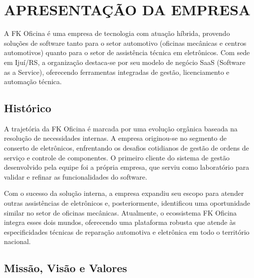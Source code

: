 
\chapter{APRESENTAÇÃO DA EMPRESA}
\label{ch:apresentacao-empresa}

A FK Oficina é uma empresa de tecnologia com atuação híbrida, provendo soluções de software tanto para o setor automotivo (oficinas mecânicas e centros automotivos) quanto para o setor de assistência técnica em eletrônicos. Com sede em Ijuí/RS, a organização destaca-se por seu modelo de negócio SaaS (Software as a Service), oferecendo ferramentas integradas de gestão, licenciamento e automação técnica.

\section{Histórico}
\label{sec:historico}

A trajetória da FK Oficina é marcada por uma evolução orgânica baseada na resolução de necessidades internas. A empresa originou-se no segmento de conserto de eletrônicos, enfrentando os desafios cotidianos de gestão de ordens de serviço e controle de componentes. O primeiro cliente do sistema de gestão desenvolvido pela equipe foi a própria empresa, que serviu como laboratório para validar e refinar as funcionalidades do software.

Com o sucesso da solução interna, a empresa expandiu seu escopo para atender outras assistências de eletrônicos e, posteriormente, identificou uma oportunidade similar no setor de oficinas mecânicas. Atualmente, o ecossistema FK Oficina integra esses dois mundos, oferecendo uma plataforma robusta que atende às especificidades técnicas de reparação automotiva e eletrônica em todo o território nacional.

\section{Missão, Visão e Valores}
\label{sec:missao-visao-valores}

